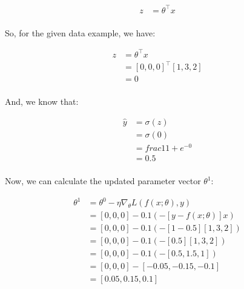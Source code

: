 \documentclass[a4paper]{article}
\theoremstyle{definition}
\newenvironment{soln}{
    \leavevmode\color{blue}\ignorespaces
}{}
\begin{document}
\begin{enumerate}
\begin{enumerate}
\begin{soln}
		$$
		\begin{align}
		z &= \theta^\top x \\
		\end{align}
		$$
		
		So, for the given data example, we have:
		
		$$
		\begin{align}
		z &= \theta^\top x \\
		&= [0, 0, 0]^\top [1, 3, 2] \\
		&= 0 \\
		\end{align}
		$$
		
		And, we know that:
		
		$$
		\begin{align}
		\hat{y} &= \sigma(z) \\
		&= \sigma(0) \\
		&= frac{1}{1 + e^{-0}} \\
		&= 0.5 \\
		\end{align}
		$$
		
		Now, we can calculate the updated parameter vector $\theta^{1}$:
		
		$$
		\begin{align}
		\theta^{1} &= \theta^{0} - \eta \nabla_{\theta} L(f(x;\theta), y) \\
		&= [0, 0, 0] - 0.1 (-[y - f(x;\theta)] x) \\
		&= [0, 0, 0] - 0.1 (-[1 - 0.5] [1, 3, 2]) \\
		&= [0, 0, 0] - 0.1 (-[0.5] [1, 3, 2]) \\
		&= [0, 0, 0] - 0.1 (-[0.5, 1.5, 1]) \\
		&= [0, 0, 0] - [-0.05, -0.15, -0.1] \\
		&= [0.05, 0.15, 0.1] \\
		\end{align}
		$$    
	\end{soln}
\end{enumerate}
\end{enumerate}
\end{document}
